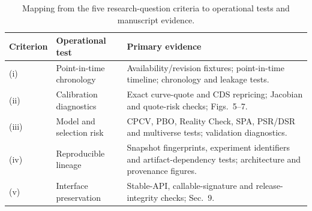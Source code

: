 \documentclass{asrpaper}
\begin{document}
\begin{table}[!t]
\centering
\caption{Mapping from the five research-question criteria to operational tests and manuscript evidence.}
\label{tab:criteria-evidence}
\small
\renewcommand{\arraystretch}{1.18}
\setlength{\tabcolsep}{6pt}
\begin{tabularx}{0.96\textwidth}{@{}>{\raggedright\arraybackslash}p{}>{\raggedright\arraybackslash}p{}>{\raggedright\arraybackslash}X@{}}
\toprule
\textbf{Criterion} & \textbf{Operational test} & \textbf{Primary evidence} \\
\midrule
(i) & Point-in-time chronology & Availability/revision fixtures; point-in-time timeline; chronology and leakage tests. \\
(ii) & Calibration diagnostics & Exact curve-quote and CDS repricing; Jacobian and quote-risk checks; Figs.~5--7. \\
(iii) & Model and selection risk & CPCV, PBO, Reality Check, SPA, PSR/DSR and multiverse tests; validation diagnostics. \\
(iv) & Reproducible lineage & Snapshot fingerprints, experiment identifiers and artifact-dependency tests; architecture and provenance figures. \\
(v) & Interface preservation & Stable-API, callable-signature and release-integrity checks; Sec.~9. \\
\bottomrule
\end{tabularx}
\end{table}
\end{document}
